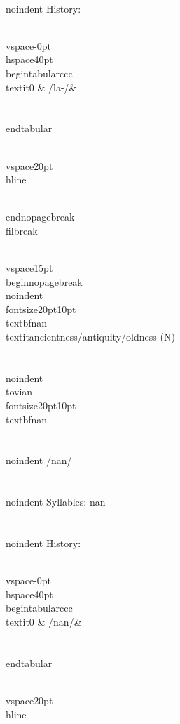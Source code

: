 \\noindent History:

\\vspace{-0pt}
\\hspace{40pt}
\\begin{tabular}{ccc}
\\textit{0} & /la-/& \\\\
\\end{tabular}

\\vspace{20pt}\\hline

\\end{nopagebreak}
\\filbreak



\\vspace{15pt}
\\begin{nopagebreak}
\\noindent{\\fontsize{20pt}{10pt}\\textbf{nan} } \\textit{ancientness/antiquity/oldness} (N)\\\\
\\noindent {\\tovian \\fontsize{20pt}{10pt} \\textbf{nan} }\\\\
\\noindent /n{\textprimstress}an/\\\\
\\noindent Syllables: nan\\\\


\\noindent History:

\\vspace{-0pt}
\\hspace{40pt}
\\begin{tabular}{ccc}
\\textit{0} & /nan/& \\\\
\\end{tabular}

\\vspace{20pt}\\hline

